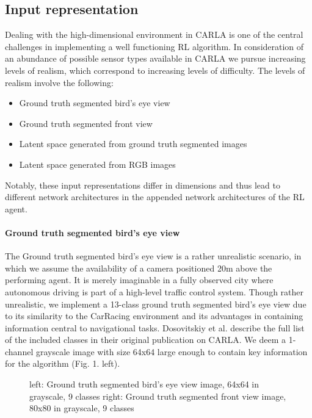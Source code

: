 \documentclass[letterpaper, 10 pt, conference]{ieeeconf}  %
\begin{document}
\subsection{Input representation}
Dealing with the high-dimensional environment in CARLA is one of the central challenges in implementing a well functioning 
RL algorithm. In consideration of an abundance of possible sensor types available in CARLA we pursue increasing
levels of realism, which correspond to increasing levels of difficulty. The levels of realism involve the following:
\begin{itemize}
    \item Ground truth segmented bird's eye view
    \item Ground truth segmented front view
    \item Latent space generated from ground truth segmented images
    \item Latent space generated from RGB images
\end{itemize}
Notably, these input representations differ in dimensions and thus lead to different network architectures in the appended network architectures 
of the RL agent. 
\paragraph{Ground truth segmented bird's eye view}
The Ground truth segmented bird's eye view is a rather unrealistic scenario, in which we assume the availability of a camera positioned 
20m above the performing agent. It is merely imaginable in a fully observed city where autonomous driving is part of a high-level traffic 
control system. Though rather unrealistic, we implement a 13-class ground truth segmented bird's eye view due to its similarity to 
the CarRacing 
environment and its advantages in containing information central to navigational tasks. 
Dosovitskiy et al.\cite{dosovitskiy2017carla} describe the full list of the included classes in their original publication on CARLA. 
We deem a 1-channel 
grayscale image with size 64x64 
large enough to contain key information for the algorithm (Fig. 1. left).

\begin{figure}[thpb]
    \centering
    \caption{left: Ground truth segmented bird's eye view image, 64x64 in grayscale, 9 classes
    right: Ground truth segmented front view image, 80x80 in grayscale, 9 classes}
        \label{figurelabel}
        \end{figure}
\end{document}
